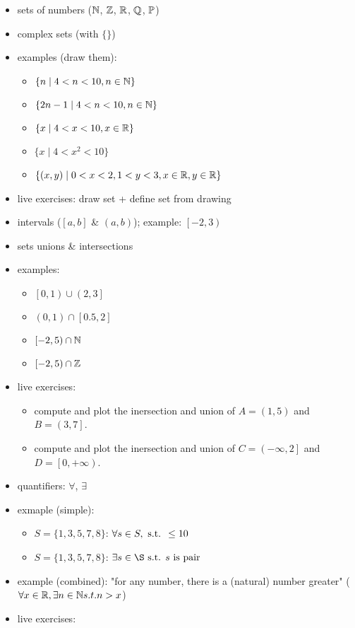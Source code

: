 \begin{itemize}
\tightlist
\item
  sets of numbers (\(\mathbb{N}\), \(\mathbb{Z}\), \(\mathbb{R}\), \(\mathbb{Q}\), \(\mathbb{P}\))
\item
  complex sets (with \(\{ \}\))
\item
  examples (draw them):

  \begin{itemize}
  \tightlist
  \item
    \(\{n \mid 4<n<10, n \in \mathbb{N} \}\)
  \item
    \(\{2n-1 \mid 4<n<10 , n \in \mathbb{N} \}\)
  \item
    \(\{x \mid 4<x<10, x \in \mathbb{R} \}\)
  \item
    \(\{x \mid 4<x^2<10 \}\)
  \item
    \(\{(x,y) \mid 0<x<2 , 1<y<3, x \in \mathbb{R}, y \in \mathbb{R} \}\)
  \end{itemize}
\item
  live exercises: draw set + define set from drawing
\item
  intervals (\(\left[a,b\right]\) \& \(\left(a,b\right)\)); example:
  \(\left[-2, 3\right)\)
\item
  sets unions \& intersections
\item
  examples:

  \begin{itemize}
  \tightlist
  \item
    \(\left[0,1\right) \cup \left(2,3\right]\)
  \item
    \(\left(0,1\right) \cap \left[0.5,2\right]\)
  \item
    \(\left[-2,5\right) \cap \mathbb{N}\)
  \item
    \(\left[-2,5\right) \cap \mathbb{Z}\)
  \end{itemize}
\item
  live exercises:

  \begin{itemize}
  \tightlist
  \item
    compute and plot the inersection and union of
    \(A = \left(1, 5\right)\) and \(B = \left(3, 7\right]\).
  \item
    compute and plot the inersection and union of
    \(C = \left(-\infty, 2\right]\) and
    \(D = \left[0, +\infty \right)\).
  \end{itemize}
\item
  quantifiers: \(\forall\), \(\exists\)
\item
  exmaple (simple):

  \begin{itemize}
  \tightlist
  \item
    \(S = \{1,3,5,7,8\}\): \(\forall s \in S, \text{ s.t. } \leq 10\)
  \item
    \(S = \{1,3,5,7,8\}\): \(\exists s \in \S \st s \text{ is pair}\)
  \end{itemize}
\item
  example (combined): "for any number, there is a (natural) number
  greater" (\(\forall x \in \mathbb{R}, \exists n \in \mathbb{N} s.t. n>x\))
\item
  live exercises:


\end{itemize}
